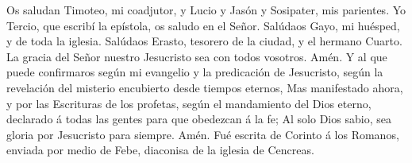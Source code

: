  Os saludan Timoteo, mi coadjutor, y Lucio y Jasón y
Sosipater, mis parientes.  Yo Tercio, que escribí la
epístola, os saludo en el Señor.  Salúdaos Gayo, mi
huésped, y de toda la iglesia. Salúdaos Erasto, tesorero de la ciudad, y
el hermano Cuarto.  La gracia del Señor nuestro Jesucristo
sea con todos vosotros. Amén.  Y al que puede confirmaros
según mi evangelio y la predicación de Jesucristo, según la revelación
del misterio encubierto desde tiempos eternos,  Mas
manifestado ahora, y por las Escrituras de los profetas, según el
mandamiento del Dios eterno, declarado á todas las gentes para que
obedezcan á la fe;  Al solo Dios sabio, sea gloria por
Jesucristo para siempre. Amén. Fué escrita de Corinto á los Romanos,
enviada por medio de Febe, diaconisa de la iglesia de Cencreas.
